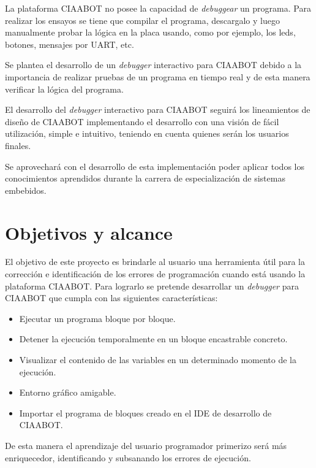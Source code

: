 La plataforma CIAABOT no posee la capacidad de \emph{debuggear} un programa.
Para realizar los ensayos se tiene que compilar el programa, descargalo y luego manualmente probar la lógica en la placa usando, como por ejemplo, los leds, botones, mensajes por UART, etc.

Se plantea el desarrollo de un \emph{debugger} interactivo para CIAABOT debido a la
importancia de realizar pruebas de un programa en tiempo real y de esta manera verificar la lógica del programa.

El desarrollo del \emph{debugger} interactivo para CIAABOT seguirá los lineamientos
de diseño de CIAABOT implementando el desarrollo con una visión de
fácil utilización, simple e intuitivo, teniendo en cuenta quienes serán los usuarios
finales.

Se aprovechará con el desarrollo de esta implementación poder aplicar todos los
conocimientos aprendidos durante la carrera de especialización de sistemas embebidos.



\section{Objetivos y alcance}
\label{Objetivos y alcance}

El objetivo de este proyecto es brindarle al usuario una herramienta útil para la
corrección e identificación de los errores de programación cuando está usando
la plataforma CIAABOT. Para lograrlo se pretende desarrollar un \emph{debugger} para
CIAABOT que cumpla con las siguientes características: 

\begin{itemize}
	\item Ejecutar un programa bloque por bloque.
	\item Detener la ejecución temporalmente en un bloque encastrable concreto.
	\item Visualizar el contenido de las variables en un determinado momento de la
	ejecución.
	\item Entorno gráfico amigable.
	\item Importar el programa de bloques creado en el IDE de desarrollo de CIAABOT.	
\end{itemize}

De esta manera el aprendizaje del usuario programador primerizo será más enriquecedor,
identificando y subsanando los errores de ejecución.







